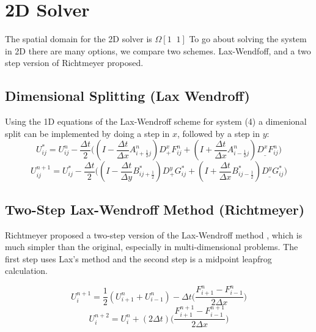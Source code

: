 
\section{2D Solver}
The spatial domain for the 2D solver is $\Omega [1\;\;1]$ To go about solving the system in 2D there are many options,
we compare two schemes. Lax-Wendfoff, and a two step version of Richtmeyer proposed. \newline
\newline

\subsection{Dimensional Splitting (Lax Wendroff)}

Using the 1D equations of the Lax-Wendroff scheme for system (4) a dimenional split can be implemented by 
doing a step in $x$, followed by a step in $y$: 
\begin{equation}\label{eqn:6}
U_{ij}^* = U_{ij}^n - \frac{\Delta t}{2} 
\bigg(( I- \frac{\Delta t}{\Delta x} A_{i+\frac{1}{2}j}^n ) D_+^xF_{ij}^n 
+ (I+ \frac{\Delta t}{\Delta x} A_{i-\frac{1}{2}j}^n) D_{\_}^xF_{ij}^n\bigg)
\end{equation}
\begin{equation}\label{eqn:7}
U_{ij}^{n+1} = U_{ij}^* - 
\frac{\Delta t}{2} \bigg((I - \frac{\Delta t}{\Delta y} B_{ij+\frac{1}{2}}^*) D_+^yG_{ij}^*
 +(I + \frac{\Delta t}{\Delta x} B_{ij-\frac{1}{2}}^*) D_{\_}^y G_{ij}^* \bigg)
\end{equation}
\newline


\subsection{Two-Step Lax-Wendroff Method (Richtmeyer)}

Richtmeyer proposed a two-step version of the Lax-Wendroff method \cite{Roach}, which is much simpler than the original, especially in multi-dimensional problems.
The first step uses Lax's  method and the second step is a midpoint leapfrog calculation. 

\begin{equation}\label{eqn:8}
U_{i}^{n+1} = \frac{1}{2}(U_{i+1}^{n}+U_{i-1}^{n})-\Delta{t} \Big(\frac{F_{i+1}^{n}-F_{i-1}^{n}}{2\Delta x}\Big)
\end{equation}
\begin{equation}\label{eqn:9}
U_{i}^{n+2} = U_{i}^{n} + (2\Delta t) \Big ( \frac{ F_{i+1}^{n+1}-F_{i-1}^{n+1} }{ 2 \Delta x } \Big)
\end{equation} 
\newline

